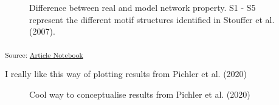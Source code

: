 \documentclass[
]{agujournal2019}
\begin{document}
\begin{figure}[H]


\caption{\label{fig-topology}Difference between real and model network
property. S1 - S5 represent the different motif structures identified in
Stouffer et al. (2007).}

\end{figure}%

\textsubscript{Source:
\href{https://BecksLab.github.io/ms_t_is_for_topology/index.qmd.html}{Article
Notebook}}

I really like this way of plotting results from Pichler et al. (2020)

\begin{figure}


\caption{\label{fig-pichler}Cool way to conceptualise results from
Pichler et al. (2020)}

\end{figure}%
\end{document}
